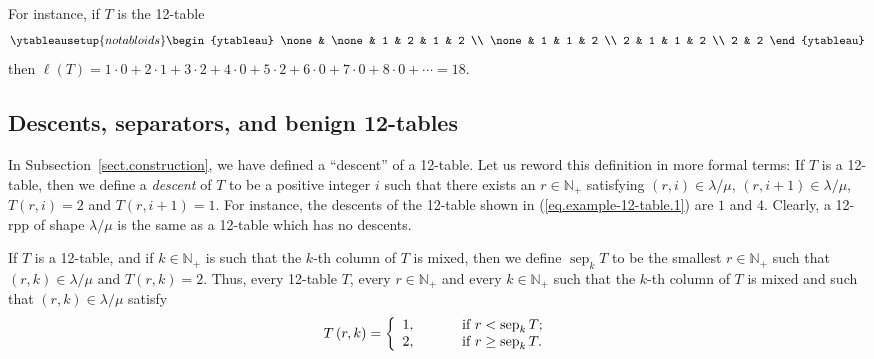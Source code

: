 \documentclass[12pt]{article}
\theoremstyle{plain}
\theoremstyle{definition}
\def\lm{{\lambda/\mu}}
\begin{document}
For instance, if $T$ is the 12-table
\begin{equation}
%
\ytableausetup{notabloids}
\begin{ytableau}
\none& \none& 1 & 2 & 1 & 2 \\
\none& 1 & 1 & 2 \\
2 & 1 & 1 & 2 \\
2 & 2
\end{ytableau}%
\label{eq.example-12-table.1}
\end{equation}
then $\ell\left(  T\right)  =1\cdot0+2\cdot1+3\cdot2+4\cdot0+5\cdot
2+6\cdot0+7\cdot0+8\cdot0+\cdots=18$.

\subsection{\label{subsection:benign}Descents, separators, and benign 12-tables}

In Subsection~\ref{sect.construction}, we have defined a ``descent''
of a 12-table. Let us reword this definition in more formal terms:
If $T$ is a 12-table, then we define a \textit{descent} of $T$ to be a
positive integer $i$ such that there exists an $r\in\mathbb{N}_{+}$ satisfying
$\left(  r,i\right)  \in \lm$, $\left(  r,i+1\right)  \in \lm$, $T\left(
r,i\right)  =2$ and $T\left(  r,i+1\right)  =1$. For instance,
the descents of the 12-table shown in (\ref{eq.example-12-table.1})
are $1$ and $4$. Clearly, a 12-rpp of shape $\lm$ is the same as a 12-table which has no
descents.

If $T$ is a 12-table, and if $k\in\mathbb{N}_{+}$ is such that the $k$-th
column of $T$ is mixed, then we define $\operatorname*{sep}\nolimits_{k}T$ to
be the smallest $r\in\mathbb{N}_{+}$ such that $\left(  r,k\right)  \in \lm$ and
$T\left(  r,k\right)  =2$. Thus, every 12-table $T$, every
$r\in\mathbb{N}_{+}$ and every $k\in\mathbb{N}_{+}$ such that the $k$-th
column of $T$ is mixed and such that $\left(  r,k\right)  \in \lm$ satisfy%
\begin{equation}
T\left(  r,k\right)  =\left\{
\begin{array}
[c]{l}%
1,\ \ \ \ \ \ \ \ \ \ \text{if }r<\operatorname*{sep}\nolimits_{k}T;\\
2,\ \ \ \ \ \ \ \ \ \ \text{if }r\geq\operatorname*{sep}\nolimits_{k}T.
\end{array}
\right.  \label{pf.lem.BK.Tsep}%
\end{equation}
\end{document}

